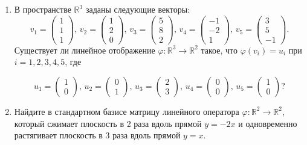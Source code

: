 \documentclass[a4paper,12pt]{article}
\begin{document}
\begin{enumerate}
\vspace{5pt}



\item В пространстве $\mathbb R^3$ заданы следующие векторы:
\[
v_1 = 
\begin{pmatrix}
{1}\\{1}\\{1}
\end{pmatrix},\,
v_2 = 
\begin{pmatrix}
{1}\\{2}\\{0}
\end{pmatrix},\,
v_3 = 
\begin{pmatrix}
{5}\\{8}\\{2}
\end{pmatrix},\,
v_4 = 
\begin{pmatrix}
{-1}\\{-2}\\{1}
\end{pmatrix},\,
v_5 = 
\begin{pmatrix}
{3}\\{5}\\{-1}
\end{pmatrix}.
\]
Существует ли линейное отображение $\varphi\colon \mathbb R^3\to \mathbb R^2$ такое, что $\varphi(v_i) = u_i$ при $i = 1, 2, 3, 4, 5$, где

\[
u_1 = 
\begin{pmatrix}
{1}\\{0}
\end{pmatrix},\,
u_2 = 
\begin{pmatrix}
{0}\\{1}
\end{pmatrix},\,
u_3 = 
\begin{pmatrix}
{2}\\{3}
\end{pmatrix},\,
u_4 = 
\begin{pmatrix}
{0}\\{0}
\end{pmatrix},\,
u_5 = 
\begin{pmatrix}
{1}\\{0}
\end{pmatrix}?
\]

\vspace{5pt}

\item Найдите в стандартном базисе матрицу линейного оператора $\varphi\colon \mathbb R^2\to \mathbb R^2$, который сжимает плоскость в 2 раза вдоль прямой $y = -2x$ и одновременно растягивает плоскость в 3 раза вдоль прямой $y = x$.


\end{enumerate}
\end{document}
